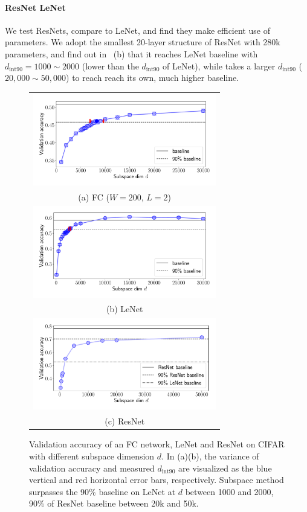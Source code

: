 \documentclass{article} %
\newcommand{\dintn}{d_{\mathrm{int90}}}
\begin{document}
\paragraph{ResNet \vs LeNet}
We test ResNets, compare to LeNet, and find they make efficient use of parameters.
We adopt the smallest 20-layer structure of ResNet with 280k parameters, and find out in~ (b) that it reaches LeNet baseline with $\dintn=1000 \sim 2000$ (lower than the $\dintn$ of LeNet), while takes a larger $\dintn$ ($20,000 \sim 50,000$) to reach reach its own, much higher baseline.
%
\begin{figure}[h!] \centering
	\begin{tabular}{c}
		\hspace{-3mm}
		\includegraphics[width=8.0cm]{dim_cifar_fnn_w2_std_xlim} \\
		(a) FC ($W=200$, $L=2$)
		\\		
		\includegraphics[width=8.0cm]{dim_cifar_lenet5_std_xlim}\\
		(b) LeNet 
		\\
		\includegraphics[width=8.0cm]{cifar_resnet_crop} \\
		(c) ResNet		\\          
	\end{tabular} \vspace{-2mm}
	\caption{Validation accuracy of an FC network, LeNet and ResNet on CIFAR with different subspace dimension $d$. In (a)(b), the variance of validation accuracy and measured  $\dintn$ are visualized as the blue vertical and red horizontal error bars, respectively. Subspace method surpasses the 90\% baseline on LeNet at $d$ between 1000 and 2000,  90\% of ResNet baseline between 20k and 50k.}
	\label{fig:conv_cifar}
	\vspace{-2mm}
\end{figure}
%
\end{document}
